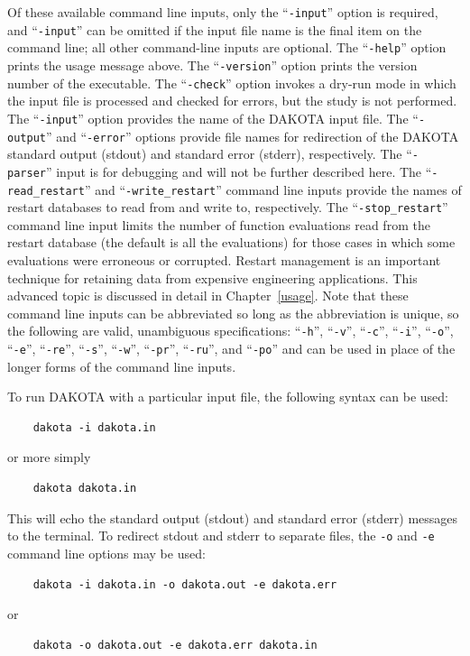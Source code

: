 Of these available command line inputs, only the ``\texttt{-input}''
option is required, and ``\texttt{-input}'' can be omitted if the
input file name is the final item on the command line; all other
command-line inputs are optional. The ``\texttt{-help}'' option prints
the usage message above. The ``\texttt{-version}'' option prints the
version number of the executable. The ``\texttt{-check}'' option
invokes a dry-run mode in which the input file is processed and
checked for errors, but the study is not performed. The
``\texttt{-input}'' option provides the name of the DAKOTA input file.
The ``\texttt{-output}'' and ``\texttt{-error}'' options provide file
names for redirection of the DAKOTA standard output (stdout) and
standard error (stderr), respectively.  The ``\texttt{-parser}'' input
is for debugging and will not be further described here.  The
``\texttt{-read\_restart}'' and ``\texttt{-write\_restart}'' command
line inputs provide the names of restart databases to read from and
write to, respectively. The ``\texttt{-stop\_restart}'' command line
input limits the number of function evaluations read from the restart
database (the default is all the evaluations) for those cases in which
some evaluations were erroneous or corrupted. Restart management is an
important technique for retaining data from expensive engineering
applications. This advanced topic is discussed in detail in
Chapter~\ref{usage}. Note that these command line inputs can be
abbreviated so long as the abbreviation is unique, so the following
are valid, unambiguous specifications: ``\texttt{-h}'',
``\texttt{-v}'', ``\texttt{-c}'', ``\texttt{-i}'', ``\texttt{-o}'',
``\texttt{-e}'', ``\texttt{-re}'', ``\texttt{-s}'', ``\texttt{-w}'',
``\texttt{-pr}'', ``\texttt{-ru}'', and ``\texttt{-po}'' and can be
used in place of the longer forms of the command line inputs.

To run DAKOTA with a particular input file, the following syntax can
be used:
\begin{small}
\begin{verbatim}
    dakota -i dakota.in
\end{verbatim}
\end{small}
or more simply
\begin{small}
\begin{verbatim}
    dakota dakota.in
\end{verbatim}
\end{small}

This will echo the standard output (stdout) and standard error
(stderr) messages to the terminal. To redirect stdout and stderr to
separate files, the \texttt{-o} and \texttt{-e} command line options
may be used:
\begin{small}
\begin{verbatim}
    dakota -i dakota.in -o dakota.out -e dakota.err
\end{verbatim}
\end{small}
or
\begin{small}
\begin{verbatim}
    dakota -o dakota.out -e dakota.err dakota.in
\end{verbatim}
\end{small}

